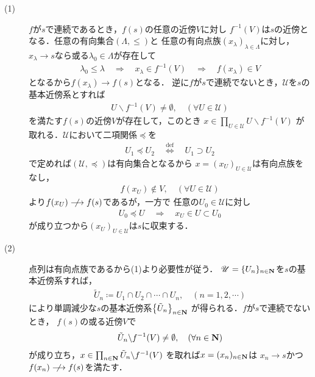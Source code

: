 	\begin{prf}\mbox{}
		\begin{description}
			\item[(1)] $f$が$s$で連続であるとき，$f(s)$の任意の近傍$V$に対し
				$f^{-1}(V)$は$s$の近傍となる．任意の有向集合$(\Lambda,\leq)$と
				任意の有向点族$(x_\lambda)_{\lambda \in \Lambda}$に対し，
				$x_\lambda \longrightarrow s$なら或る$\lambda_0 \in \Lambda$が存在して
				\begin{align}
					\lambda_0 \leq \lambda \quad \Longrightarrow \quad
					x_\lambda \in f^{-1}(V) \quad \Longrightarrow \quad
					f(x_\lambda) \in V
				\end{align}
				となるから$f(x_\lambda) \longrightarrow f(s)$となる．
				逆に$f$が$s$で連続でないとき，$\mathscr{U}$を$s$の基本近傍系とすれば
				\begin{align}
					U \backslash f^{-1}(V) \neq \emptyset,
					\quad (\forall U \in \mathscr{U})
				\end{align}
				を満たす$f(s)$の近傍$V$が存在して，このとき
				$x \in \prod_{U \in \mathscr{U}} U \backslash f^{-1}(V)$
				が取れる．$\mathscr{U}$において二項関係$\preceq$を
				\begin{align}
					U_1 \preceq U_2 
					\quad \overset{\mathrm{def}}{\Longleftrightarrow} \quad
					U_1 \supset U_2
				\end{align}
				で定めれば$(\mathscr{U},\preceq)$は有向集合となるから
				$x = (x_U)_{U \in \mathscr{U}}$は有向点族をなし，
				\begin{align}
					f(x_U) \notin V,\quad (\forall U \in \mathscr{U})
				\end{align}
				より$f(x_U) \centernot\longrightarrow f(s)$であるが，一方で
				任意の$U_0 \in \mathscr{U}$に対し
				\begin{align}
					U_0 \preceq U \quad \Longrightarrow \quad
					x_U \in U \subset U_0
				\end{align}
				が成り立つから$(x_U)_{U \in \mathscr{U}}$は$s$に収束する．
			
			\item[(2)] 点列は有向点族であるから(1)より必要性が従う．
				$\mathscr{U} = \{U_n\}_{n \in \mathbf{N}}$を$s$の基本近傍系すれば，
				\begin{align}
					\tilde{U}_n \coloneqq
					U_1 \cap U_2 \cap \cdots \cap U_n,
					\quad (n=1,2,\cdots)
				\end{align}
				により単調減少な$s$の基本近傍系$\left\{\tilde{U}_n\right\}_{n \in \mathbf{N}}$
				が得られる．$f$が$s$で連続でないとき，
				$f(s)$の或る近傍$V$で
				\begin{align}
					\tilde{U}_n \backslash f^{-1}(V) \neq \emptyset,
					\quad (\forall n \in \mathbf{N})
				\end{align}
				が成り立ち，$x \in \prod_{n \in \mathbf{N}} \tilde{U}_n \backslash f^{-1}(V)$
				を取れば$x = (x_n)_{n \in \mathbf{N}}$は
				$x_n \longrightarrow s$かつ$f(x_n) \centernot\longrightarrow f(s)$を満たす．
				\QED
		\end{description}
	\end{prf}
	

